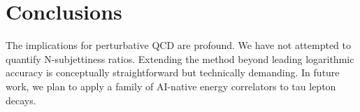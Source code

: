 \section{Conclusions}\label{sec:conclusions}

The implications for perturbative QCD are profound. We have not
attempted to quantify N-subjettiness ratios. Extending the method beyond
leading logarithmic accuracy is conceptually straightforward but
technically demanding. In future work, we plan to apply a family of
AI-native energy correlators to tau lepton decays.

